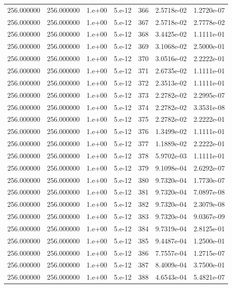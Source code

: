 \begin{table}[htbp]
\begin{tabular}{rrrrrrr}
256.000000 & 256.000000 & 1.e+00 & 5.e-12 & 366 & 2.5718e-02 & 1.2720e-07 \\
256.000000 & 256.000000 & 1.e+00 & 5.e-12 & 367 & 2.5718e-02 & 2.7778e-02 \\
256.000000 & 256.000000 & 1.e+00 & 5.e-12 & 368 & 3.4425e-02 & 1.1111e-01 \\
256.000000 & 256.000000 & 1.e+00 & 5.e-12 & 369 & 3.1068e-02 & 2.5000e-01 \\
256.000000 & 256.000000 & 1.e+00 & 5.e-12 & 370 & 3.0516e-02 & 2.2222e-01 \\
256.000000 & 256.000000 & 1.e+00 & 5.e-12 & 371 & 2.6735e-02 & 1.1111e-01 \\
256.000000 & 256.000000 & 1.e+00 & 5.e-12 & 372 & 2.3513e-02 & 1.1111e-01 \\
256.000000 & 256.000000 & 1.e+00 & 5.e-12 & 373 & 2.2782e-02 & 2.2995e-07 \\
256.000000 & 256.000000 & 1.e+00 & 5.e-12 & 374 & 2.2782e-02 & 3.3531e-08 \\
256.000000 & 256.000000 & 1.e+00 & 5.e-12 & 375 & 2.2782e-02 & 2.2222e-01 \\
256.000000 & 256.000000 & 1.e+00 & 5.e-12 & 376 & 1.3499e-02 & 1.1111e-01 \\
256.000000 & 256.000000 & 1.e+00 & 5.e-12 & 377 & 1.1889e-02 & 2.2222e-01 \\
256.000000 & 256.000000 & 1.e+00 & 5.e-12 & 378 & 5.9702e-03 & 1.1111e-01 \\
256.000000 & 256.000000 & 1.e+00 & 5.e-12 & 379 & 9.1098e-04 & 2.6292e-07 \\
256.000000 & 256.000000 & 1.e+00 & 5.e-12 & 380 & 9.7320e-04 & 1.7730e-07 \\
256.000000 & 256.000000 & 1.e+00 & 5.e-12 & 381 & 9.7320e-04 & 7.0897e-08 \\
256.000000 & 256.000000 & 1.e+00 & 5.e-12 & 382 & 9.7320e-04 & 2.3079e-08 \\
256.000000 & 256.000000 & 1.e+00 & 5.e-12 & 383 & 9.7320e-04 & 9.0367e-09 \\
256.000000 & 256.000000 & 1.e+00 & 5.e-12 & 384 & 9.7319e-04 & 2.8125e-01 \\
256.000000 & 256.000000 & 1.e+00 & 5.e-12 & 385 & 9.4487e-04 & 1.2500e-01 \\
256.000000 & 256.000000 & 1.e+00 & 5.e-12 & 386 & 7.7557e-04 & 1.2715e-07 \\
256.000000 & 256.000000 & 1.e+00 & 5.e-12 & 387 & 8.4009e-04 & 3.7500e-01 \\
256.000000 & 256.000000 & 1.e+00 & 5.e-12 & 388 & 4.6543e-04 & 5.4821e-07 \\

\end{tabular}
\end{table}
